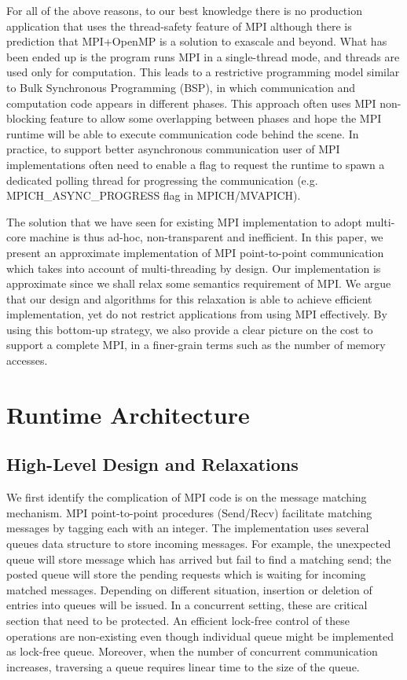\documentclass[11pt]{article}
\begin{document}
For all of the above reasons, to our best knowledge there is no production
application that uses the thread-safety feature of MPI although there is
prediction that MPI+OpenMP is a solution to exascale and beyond. What has been
ended up is the program runs MPI in a single-thread mode, and
threads are used only for computation. This leads to a restrictive
programming model similar to Bulk Synchronous Programming (BSP), in which
communication and computation code appears in different phases. This approach
often uses MPI non-blocking feature to allow some overlapping between phases
and hope the MPI runtime will be able to execute communication code behind the
scene. In practice, to support better asynchronous communication user of MPI
implementations often need to enable a flag to request the runtime to spawn a
dedicated polling thread for progressing the communication (e.g.
MPICH_ASYNC_PROGRESS flag in MPICH/MVAPICH).

The solution that we have seen for existing MPI implementation to adopt
multi-core machine is thus ad-hoc, non-transparent and inefficient. In this
paper, we present an approximate implementation of MPI point-to-point
communication which takes into account of multi-threading by design. Our
implementation is approximate since we shall relax some semantics requirement
of MPI. We argue that our design and algorithms for this relaxation is able to
achieve efficient implementation, yet do not restrict applications from using
MPI effectively. By using this bottom-up strategy, we also provide a clear
picture on the cost to support a complete MPI, in a finer-grain terms
such as the number of memory accesses.

\section{Runtime Architecture}
\subsection{High-Level Design and Relaxations}
We first identify the complication of MPI code is on the message matching
mechanism. MPI point-to-point procedures (Send/Recv) facilitate matching
messages by tagging each with an integer. The implementation uses several
queues data structure to store incoming messages. For example, the unexpected
queue will store message which has arrived but fail to find a matching send;
the posted queue will store the pending requests which is waiting for incoming
matched messages.  Depending on different situation, insertion or deletion of
entries into queues will be issued. In a concurrent setting, these are critical
section that need to be protected. An efficient lock-free control of these
operations are non-existing even though individual queue might be implemented
as lock-free queue. Moreover, when the number of concurrent communication
increases, traversing a queue requires linear time to the size of the queue.
\end{document}
